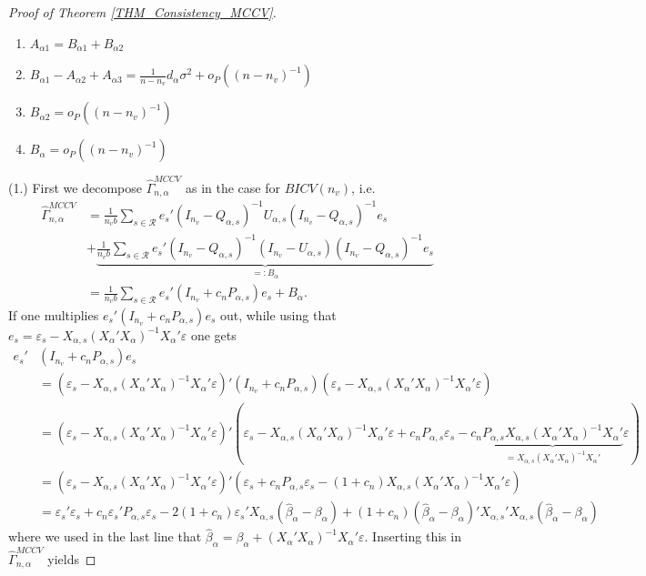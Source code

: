\documentclass[Research_Module_ES.tex]{subfiles}
\begin{document}
\begin{proof}[Proof of Theorem \ref{THM_Consistency_MCCV}]
\begin{enumerate}
		\item $A_{\alpha1} = B_{\alpha1}+ B_{\alpha2}$
		\item $ B_{\alpha1}-A_{\alpha2}+A_{\alpha3} = \frac{1}{n-n_v}d_\alpha\sigma^2 + o_P((n-n_v)^{-1})$
		\item $B_{\alpha2} = o_P((n-n_v)^{-1})$
		\item $B_{\alpha} = o_P((n-n_v)^{-1})$
	\end{enumerate}
	(1.)
	First we decompose $\hat{\Gamma}_{n,\alpha}^{MCCV}$ as in the case for $BICV(n_v)$, i.e.
	\begin{align*}
	\hat{\Gamma}_{n,\alpha}^{MCCV} &= \frac{1}{n_vb}\sum_{s\in\mathcal{R}}e_s'(I_{n_v}-Q_{\alpha,s})^{-1}U_{\alpha,s}(I_{n_v}-Q_{\alpha,s})^{-1}e_s\\
	&+\underbrace{\frac{1}{n_vb}\sum_{s\in\mathcal{R}}e_s'(I_{n_v}-Q_{\alpha,s})^{-1}(I_{n_v}-U_{\alpha,s})(I_{n_v}-Q_{\alpha,s})^{-1}e_s}_{=:B_{\alpha}}\\
	&= \frac{1}{n_vb}\sum_{s\in\mathcal{R}}e_s'(I_{n_v}+c_nP_{\alpha,s})e_s + B_\alpha.
	\end{align*}
	If one multiplies $e_s'(I_{n_v}+c_nP_{\alpha,s})e_s$ out, while using that $e_s = \varepsilon_s - X_{\alpha,s}(X_\alpha'X_\alpha)^{-1}X_\alpha'\varepsilon$ one gets
	\begin{align*}
	e_s'&(I_{n_v}+c_nP_{\alpha,s})e_s \\
	&= (\varepsilon_s - X_{\alpha,s}(X_\alpha'X_\alpha)^{-1}X_\alpha'\varepsilon)'(I_{n_v}+c_nP_{\alpha,s})(\varepsilon_s - X_{\alpha,s}(X_\alpha'X_\alpha)^{-1}X_\alpha'\varepsilon)\\
	&= (\varepsilon_s - X_{\alpha,s}(X_\alpha'X_\alpha)^{-1}X_\alpha'\varepsilon)'(\varepsilon_s - X_{\alpha,s}(X_\alpha'X_\alpha)^{-1}X_\alpha'\varepsilon + c_nP_{\alpha,s}\varepsilon_s - c_n\underbrace{P_{\alpha,s}X_{\alpha,s}(X_\alpha'X_\alpha)^{-1}X_\alpha'}_{=X_{\alpha,s}(X_\alpha'X_\alpha)^{-1}X_\alpha'}\varepsilon)\\
	&= (\varepsilon_s - X_{\alpha,s}(X_\alpha'X_\alpha)^{-1}X_\alpha'\varepsilon)'(\varepsilon_s + c_nP_{\alpha,s}\varepsilon_s -(1+c_n) X_{\alpha,s}(X_\alpha'X_\alpha)^{-1}X_\alpha'\varepsilon)  \\
	&= \varepsilon_s'\varepsilon_s + c_n \varepsilon_s'P_{\alpha,s}\varepsilon_s -2(1+c_n)\varepsilon_s' X_{\alpha,s}(\hat{\beta}_\alpha-\beta_\alpha) + (1+c_n)(\hat{\beta}_\alpha-\beta_\alpha)'X_{\alpha,s}'X_{\alpha,s}(\hat{\beta}_\alpha-\beta_\alpha)
	\end{align*}
	where we used in the last line that $\hat{\beta}_\alpha = \beta_\alpha + (X_\alpha'X_\alpha)^{-1}X_\alpha'\varepsilon$. Inserting this in $\hat{\Gamma}_{n,\alpha}^{MCCV}$ yields 

\end{proof}
\end{document}
